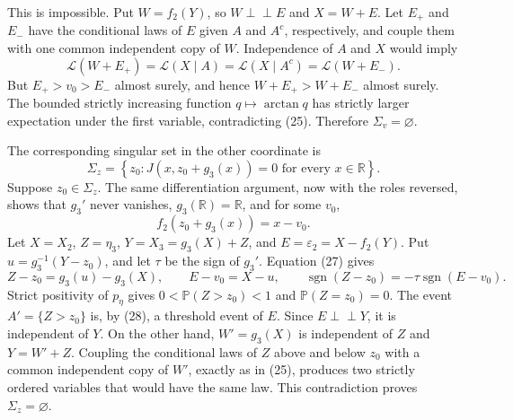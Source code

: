 This is impossible.  Put \(W=f_2(Y)\), so \(W\perp\!\!\!\perp E\) and \(X=W+E\).  Let \(E_+\) and \(E_-\) have the conditional laws of \(E\) given \(A\) and \(A^c\), respectively, and couple them with one common independent copy of \(W\).  Independence of \(A\) and \(X\) would imply
\[
 \mathcal L(W+E_+)=\mathcal L(X\mid A)
 =\mathcal L(X\mid A^c)=\mathcal L(W+E_-).
\tag{25}
\]
But \(E_+>v_0>E_-\) almost surely, and hence \(W+E_+>W+E_-\) almost surely.  The bounded strictly increasing function \(q\mapsto\arctan q\) has strictly larger expectation under the first variable, contradicting (25).  Therefore \(\Sigma_v=\varnothing\).

The corresponding singular set in the other coordinate is
\[
 \Sigma_z=\left\{z_0:J(x,z_0+g_3(x))=0\text{ for every }x\in\mathbb R\right\}.
\tag{26}
\]
Suppose \(z_0\in\Sigma_z\).  The same differentiation argument, now with the roles reversed, shows that \(g_3'\) never vanishes, \(g_3(\mathbb R)=\mathbb R\), and for some \(v_0\),
\[
 f_2(z_0+g_3(x))=x-v_0.
\tag{27}
\]
Let \(X=X_2\), \(Z=\eta_3\), \(Y=X_3=g_3(X)+Z\), and \(E=\varepsilon_2=X-f_2(Y)\).  Put \(u=g_3^{-1}(Y-z_0)\), and let \(\tau\) be the sign of \(g_3'\).  Equation (27) gives
\[
 Z-z_0=g_3(u)-g_3(X),
 \qquad E-v_0=X-u,
 \qquad \operatorname{sgn}(Z-z_0)=-\tau\operatorname{sgn}(E-v_0).
\tag{28}
\]
Strict positivity of \(p_\eta\) gives \(0<\mathbb P(Z>z_0)<1\) and \(\mathbb P(Z=z_0)=0\).  The event \(A' =\{Z>z_0\}\) is, by (28), a threshold event of \(E\).  Since \(E\perp\!\!\!\perp Y\), it is independent of \(Y\).  On the other hand, \(W'=g_3(X)\) is independent of \(Z\) and \(Y=W'+Z\).  Coupling the conditional laws of \(Z\) above and below \(z_0\) with a common independent copy of \(W'\), exactly as in (25), produces two strictly ordered variables that would have the same law.  This contradiction proves \(\Sigma_z=\varnothing\).

